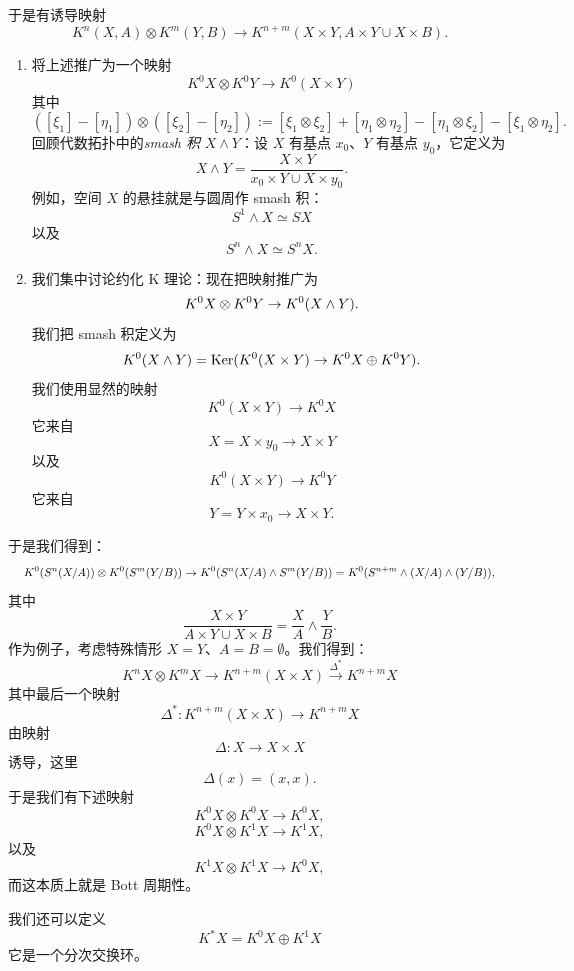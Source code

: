 于是有诱导映射
\[ K^n(X,A)\otimes K^m(Y,B)\to K^{n+m}(X\times Y, A\times Y\cup X\times B). \]

\begin{enumerate}[label=\arabic*.]
\item 将上述推广为一个映射
\[ K^0X\otimes K^0Y\to K^0(X\times Y) \]
其中
\[ ([\xi_1]-[\eta_1])\otimes([\xi_2]-[\eta_2]) := [\xi_1\otimes\xi_2]+[\eta_1\otimes\eta_2]-[\eta_1\otimes\xi_2]-[\xi_1\otimes\eta_2]. \]
回顾代数拓扑中的\emph{smash 积} $X\wedge Y$：设 $X$ 有基点 $x_0$、$Y$ 有基点 $y_0$，它定义为
\[ X\wedge Y = \frac{X\times Y}{x_0\times Y\cup X\times y_0}. \]
例如，空间 $X$ 的悬挂就是与圆周作 smash 积：
\[ S^1\wedge X\simeq SX \]
以及
\[ S^n\wedge X\simeq S^nX. \]
\item 我们集中讨论约化 K 理论：现在把映射推广为
\[  K^0X\otimes K^0Y\to K^0(X\wedge Y). \]
我们把 smash 积定义为
\[  K^0(X\wedge Y) = \operatorname{Ker}(K^0(X\times Y)\to K^0X\oplus K^0Y). \]
我们使用显然的映射
\[ K^0(X\times Y)\to K^0X \]
它来自
\[ X = X\times y_0\to X\times Y \]
以及
\[ K^0(X\times Y)\to K^0Y \]
它来自
\[ Y = Y\times x_0\to X\times Y. \]
\end{enumerate}

于是我们得到：
\[ \resizebox{0.98\textwidth}{!}{$\displaystyle \wt K^0(S^n(X/A))\otimes\wt K^0(S^m(Y/B))\to\wt K^0(S^n(X/A)\wedge S^m(Y/B)) = \wt K^0(S^{n+m}\wedge(X/A)\wedge(Y/B)),$} \]
其中
\[ \frac{X\times Y}{A\times Y\cup X\times B} = \frac{X}{A}\wedge\frac{Y}{B}. \]
作为例子，考虑特殊情形 $X = Y$、$A = B = \emptyset$。我们得到：
\[ K^nX\otimes K^mX\to K^{n+m}(X\times X)\xrightarrow{\Delta^*} K^{n+m}X \]
其中最后一个映射
\[ \Delta^* : K^{n+m}(X\times X)\to K^{n+m}X \]
由映射
\[ \Delta : X\to X\times X \]
诱导，这里
\[ \Delta(x) = (x,x). \]
于是我们有下述映射
\[ K^0X\otimes K^0X\to K^0X, \]
\[ K^0X\otimes K^1X\to K^1X, \]
以及
\[ K^1X\otimes K^1X\to K^0X, \]
而这本质上就是 Bott 周期性。


我们还可以定义
\[ K^*X = K^0X\oplus K^1X \]
它是一个分次交换环。

